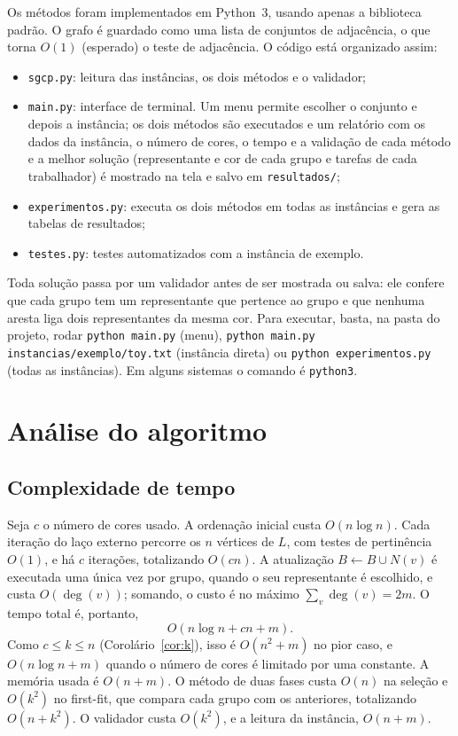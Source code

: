 \documentclass[12pt]{article}
\begin{document}
Os métodos foram implementados em Python~3, usando apenas a biblioteca padrão.
O grafo é guardado como uma lista de conjuntos de adjacência, o que torna
$O(1)$ (esperado) o teste de adjacência. O código está organizado assim:
\begin{itemize}
  \item \texttt{sgcp.py}: leitura das instâncias, os dois métodos e o
    validador;
  \item \texttt{main.py}: interface de terminal. Um menu permite escolher o
    conjunto e depois a instância; os dois métodos são executados e um
    relatório com os dados da instância, o número de cores, o tempo e a
    validação de cada método e a melhor solução (representante e cor de cada
    grupo e tarefas de cada trabalhador) é mostrado na tela e salvo em
    \texttt{resultados/};
  \item \texttt{experimentos.py}: executa os dois métodos em todas as
    instâncias e gera as tabelas de resultados;
  \item \texttt{testes.py}: testes automatizados com a instância de exemplo.
\end{itemize}
Toda solução passa por um validador antes de ser mostrada ou salva: ele confere
que cada grupo tem um representante que pertence ao grupo e que nenhuma aresta
liga dois representantes da mesma cor. Para executar, basta, na pasta do
projeto, rodar \texttt{python main.py} (menu), \texttt{python main.py
instancias/exemplo/toy.txt} (instância direta) ou \texttt{python
experimentos.py} (todas as instâncias). Em alguns sistemas o comando é
\texttt{python3}.

\section{Análise do algoritmo}\label{sec:analise}

\subsection{Complexidade de tempo}

Seja $c$ o número de cores usado. A ordenação inicial custa $O(n\log n)$. Cada
iteração do laço externo percorre os $n$ vértices de $L$, com testes de
pertinência $O(1)$, e há $c$ iterações, totalizando $O(cn)$. A atualização
$B\gets B\cup N(v)$ é executada uma única vez por grupo, quando o seu
representante é escolhido, e custa $O(\deg(v))$; somando, o custo é no máximo
$\sum_{v}\deg(v)=2m$. O tempo total é, portanto,
\[
  O(n\log n + cn + m).
\]
Como $c\le k\le n$ (Corolário~\ref{cor:k}), isso é $O(n^2+m)$ no pior caso, e
$O(n\log n + m)$ quando o número de cores é limitado por uma constante. A
memória usada é $O(n+m)$. O método de duas fases custa $O(n)$ na seleção e
$O(k^2)$ no first-fit, que compara cada grupo com os anteriores, totalizando
$O(n+k^2)$. O validador custa $O(k^2)$, e a leitura da instância, $O(n+m)$.
\end{document}
